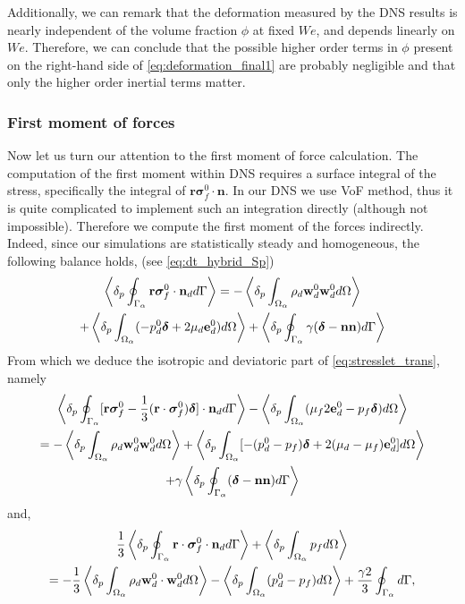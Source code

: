 Additionally, we can remark that the deformation measured by the DNS results is nearly independent of the volume fraction $\phi$ at fixed $We$, and depends linearly on $We$. 
Therefore, we can conclude that the possible higher order terms in $\phi$ present on the right-hand side of \ref{eq:deformation_final1} are probably negligible and that only the higher order inertial terms matter. 


\subsubsection{First moment of forces}

Now let us turn our attention to the first moment of force calculation. 
The computation of the first moment within DNS requires a surface integral of the stress, specifically the integral of $\textbf{r}\bm\sigma_f^0\cdot\textbf{n}$. 
In our DNS we use VoF method, thus it is quite complicated to implement such an integration directly (although not impossible).
Therefore we compute the first moment of the forces indirectly. 
Indeed, since our simulations are statistically steady and homogeneous, the following balance holds, (see \ref{eq:dt_hybrid_Sp})
\begin{multline}
    \left<\delta_p \oint_{\Gamma_{\alpha}} \textbf{r}\bm\sigma_f^0\cdot \textbf{n}_d d\Gamma\right>
    = 
    - \left<\delta_p \int_{\Omega_{\alpha}} \rho_d \textbf{w}_d^0  \textbf{w}_d^0  d\Omega\right>\\
    + \left<\delta_p \int_{\Omega_{\alpha}} (-p_d^0 \bm\delta + 2\mu_d \textbf{e}_d^0) d\Omega\right>
    +  \left<\delta_p \oint_{\Gamma_{\alpha}} \gamma (\bm\delta - \textbf{nn}) d\Gamma\right>
\end{multline}
From which we deduce the isotropic and deviatoric part of \ref{eq:stresslet_trans}, namely 
\begin{multline}
    \pSavg{[\textbf{r}\bm\sigma_f^0 - \frac{1}{3}(\textbf{r}\cdot \bm\sigma_f^0)\bm\delta]\cdot \textbf{n}_d}
    - \pOavg{(\mu_f 2 \textbf{e}_d^0  -  p_f\bm\delta)}\\
    = 
    - \pOavg{\rho_d \textbf{w}_d^0  \textbf{w}_d^0 }
    + \pOavg{[-(p_d^0-p_f) \bm\delta + 2(\mu_d-\mu_f) \textbf{e}_d^0]}\\
    + \gamma \pSavg{ (\bm\delta - \textbf{nn})}
    \label{eq:stresslet_dev}
\end{multline}
and, 
\begin{multline}
    \frac{1}{3}\pSavg{\textbf{r}\cdot\bm\sigma_f^0\cdot \textbf{n}_d}
    + \pOavg{p_f}\\
    = 
    -\frac{1}{3} \pOavg{\rho_d \textbf{w}_d^0 \cdot  \textbf{w}_d^0 }
    - \pOavg{(p_d^0-p_f) }
    + \frac{\gamma 2}{3} \intS{},
    \label{eq:stresslet_iso}
\end{multline}
